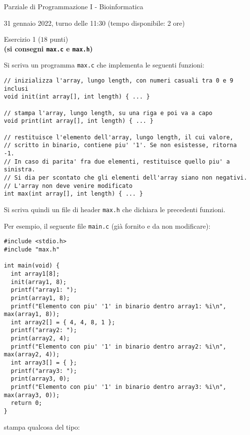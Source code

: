 \documentclass[12pt]{article}
\begin{document}
\begin{center}{\LARGE Parziale di Programmazione I - Bioinformatica}\\
\begin{center}
  \large 31 gennaio 2022, turno delle 11:30 (tempo disponibile: 2 ore)
\end{center}
\end{center}

\vspace*{1ex}
\begin{center}{\Large Esercizio 1} ($18$ punti)\\
  \textbf{(si consegni \texttt{max.c} e \texttt{max.h})}
\end{center}

Si scriva un programma \texttt{max.c} che implementa le seguenti funzioni:

\begin{center}
\begin{lstlisting}[language=myC]
// inizializza l'array, lungo length, con numeri casuali tra 0 e 9 inclusi
void init(int array[], int length) { ... }

// stampa l'array, lungo length, su una riga e poi va a capo
void print(int array[], int length) { ... }

// restituisce l'elemento dell'array, lungo length, il cui valore,
// scritto in binario, contiene piu' '1'. Se non esistesse, ritorna -1.
// In caso di parita' fra due elementi, restituisce quello piu' a sinistra.
// Si dia per scontato che gli elementi dell'array siano non negativi.
// L'array non deve venire modificato
int max(int array[], int length) { ... }
\end{lstlisting}
\end{center}
%
Si scriva quindi un file di header \texttt{max.h} che dichiara le precedenti funzioni.

Per esempio, il seguente file \texttt{main.c}
(gi\`a fornito e da non modificare):

\begin{center}
  \begin{lstlisting}[language=myC]
#include <stdio.h>
#include "max.h"

int main(void) {
  int array1[8];
  init(array1, 8);
  printf("array1: ");
  print(array1, 8);
  printf("Elemento con piu' '1' in binario dentro array1: %i\n", max(array1, 8));
  int array2[] = { 4, 4, 8, 1 };
  printf("array2: ");
  print(array2, 4);
  printf("Elemento con piu' '1' in binario dentro array2: %i\n", max(array2, 4));
  int array3[] = { };
  printf("array3: ");
  print(array3, 0);
  printf("Elemento con piu' '1' in binario dentro array3: %i\n", max(array3, 0));
  return 0;
}
  \end{lstlisting}
\end{center}
stampa qualcosa del tipo:
\end{document}
